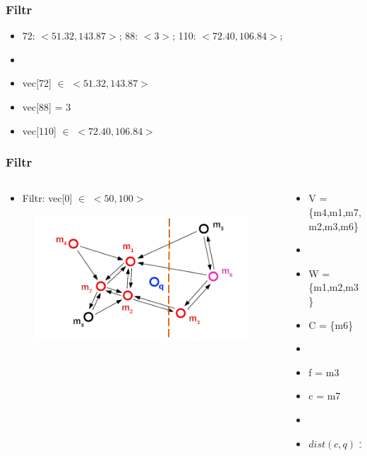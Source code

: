 \documentclass{beamer}
\begin{document}
	\begin{frame}
		\frametitle{Filtr}
		
		\begin{itemize}
			\item 72: $<51.32,143.87>$; 88: $<3>$; 110: $<72.40,106.84>$;
			\item[]
			\item vec[72] $\in$ $<51.32,143.87>$
			\item vec[88] = 3
			\item vec[110]  $\in$ $<72.40,106.84>$
		\end{itemize}
		
	\end{frame}

	\begin{frame}
		\frametitle{Filtr}
		\begin{columns}[T] %
			
			\begin{column}{.6\textwidth}
				
				\begin{itemize}
					\item[] Filtr: vec[0] $\in$ $<50,100>$
				\end{itemize}
				
				\begin{figure}
					\includegraphics[scale=0.3]{figures/Filtry_b1.png}
				\end{figure}
			\end{column}%
			\hfill%
			\begin{column}{.4\textwidth}
				\begin{itemize}
					\item V = \{m4,m1,m7,m2,m3,m6\}
					\item[]
					\item W = \{m1,m2,m3\}
					\item C = \{m6\}
					\item[]
					\item f = m3
					\item c = m7
					\item[]
					\item $dist(c,q) > dist(f,q) $
				\end{itemize}
			\end{column}%
		\end{columns}
	\end{frame}
\end{document}
